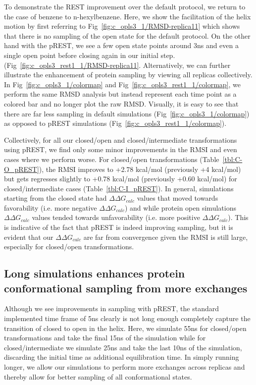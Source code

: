 \documentclass[journal=jctcce,manuscript=article]{achemso}
\begin{document}
To demonstrate the REST improvement over the default protocol, we return to the case of benzene to n-hexylbenzene.
Here, we show the facilitation of the helix motion by first referring to Fig~\ref{fig:c_opls3_1/RMSD-replica11} which shows that there is no sampling of the open state for the default protocol.
On the other hand with the pREST, we see a few open state points around 3ns and even a single open point before closing again in our initial step. (Fig~\ref{fig:c_opls3_rest1_1/RMSD-replica11}.
Alternatively, we can further illustrate the enhancement of protein sampling by viewing all replicas collectively. 
In Fig~\ref{fig:c_opls3_1/colormap} and Fig~\ref{fig:c_opls3_rest1_1/colormap}, we perform the same RMSD analysis but instead represent each time point as a colored bar and no longer plot the raw RMSD.
Visually, it is easy to see that there are far less sampling in default simulations (Fig~\ref{fig:c_opls3_1/colormap}) as opposed to pREST simulations (Fig~\ref{fig:c_opls3_rest1_1/colormap}).
 
Collectively, for all our closed/open and closed/intermediate transformations using pREST, we find only some minor improvements in the RMSI and even cases where we perform worse.
For closed/open transformations (Table~\ref{tbl:C-O_pREST}), the RMSI improves to +2.78 kcal/mol (previously +4 kcal/mol) but gets regresses slightly to +0.78 kcal/mol (previously +0.60 kcal/mol) for closed/intermediate cases (Table~\ref{tbl:C-I_pREST}).
In general, simulations starting from the closed state had $\Delta\Delta G_{calc}$ values that moved towards favorability (i.e. more negative $\Delta\Delta G_{calc}$) and while protein open simulations $\Delta\Delta G_{calc}$ values tended towards unfavorability (i.e. more positive $\Delta\Delta G_{calc}$).
This is indicative of the fact that pREST is indeed improving sampling, but it is evident that our $\Delta\Delta G_{calc}$ are far from convergence given the RMSI is still large, especially for closed/open transformations.

\subsection*{Long simulations enhances protein conformational sampling from more exchanges}
Although we see improvements in sampling with pREST, the standard implemented time frame of 5ns clearly is not long enough completely capture the transition of closed to open in the helix.
Here, we simulate 55ns for closed/open transformations and take the final 15ns of the simulation while for closed/intermediate we simulate 25ns and take the last 10ns of the simulation, discarding the initial time as additional equilibration time.
In simply running longer, we allow our simulations to perform more exchanges across replicas and thereby allow for better sampling of all conformational states.
\end{document}
